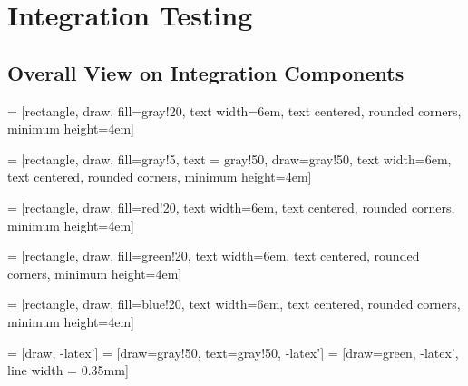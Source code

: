 \section{Integration Testing}

\subsection{Overall View on Integration Components}

 = [rectangle, draw, fill=gray!20,
    text width=6em, text centered, rounded corners, minimum height=4em]
    
 = [rectangle, draw, fill=gray!5, text = gray!50, draw=gray!50,
    text width=6em, text centered, rounded corners, minimum height=4em]

 = [rectangle, draw, fill=red!20, 
    text width=6em, text centered, rounded corners, minimum height=4em]

 = [rectangle, draw, fill=green!20, 
    text width=6em, text centered, rounded corners, minimum height=4em]
    
 = [rectangle, draw, fill=blue!20, 
    text width=6em, text centered, rounded corners, minimum height=4em]

 = [draw, -latex']
 = [draw=gray!50, text=gray!50, -latex']
 = [draw=green, -latex', line width = 0.35mm]

